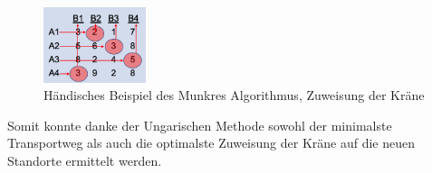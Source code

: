 \begin{figure}
\centering
\includegraphics[width=3cm]{papers/munkres/figures/Ungarische_Methode_Beispiel_Zuw.png}
\caption{Händisches Beispiel des Munkres Algorithmus, Zuweisung der Kräne }
\label{munkres:Vr2}
\end{figure} Somit konnte danke der Ungarischen Methode sowohl der minimalste Transportweg als auch die optimalste Zuweisung der Kräne auf die neuen Standorte ermittelt werden.